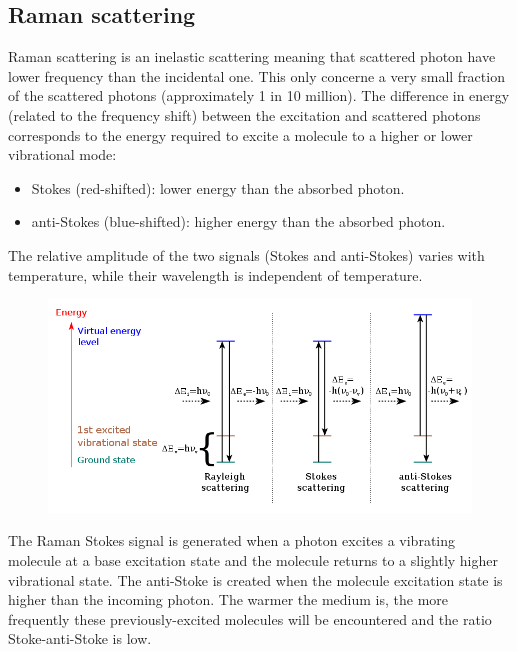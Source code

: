\documentclass[twocolumn]{article}
\numberwithin{equation}{section}
\begin{document}
	\subsection{Raman scattering}
Raman scattering is an inelastic scattering meaning that scattered photon have lower frequency than the incidental one. This only concerne a very small fraction of the scattered photons (approximately 1 in 10 million). The difference in energy (related to the frequency shift) between the excitation and scattered photons corresponds to the energy required to excite a molecule to a higher  or lower vibrational mode:
\begin{itemize}
	\item Stokes (red-shifted): lower energy than the absorbed photon.
	\item anti-Stokes (blue-shifted): higher energy than the absorbed photon.
\end{itemize}
The relative amplitude of the two signals (Stokes and anti-Stokes) varies with temperature, while their wavelength is independent of temperature.
\begin{figure}[H]
	\centering
	\includegraphics[width=.5\textwidth]{800px-Ramanscattering.png}
\end{figure}
The Raman Stokes signal is generated when a photon excites a vibrating molecule at a base excitation state and the molecule returns to a slightly higher vibrational state.	The anti-Stoke is created when the molecule excitation state is higher than the incoming photon. The warmer the medium is, the more frequently these previously-excited molecules will be encountered and the ratio Stoke-anti-Stoke is low.
\end{document}
